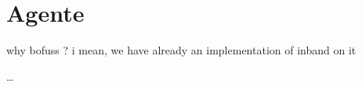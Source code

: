 \section{Agente }
\label{sec:ana_switch}

why bofuss ? i mean, we have already an implementation of inband on it

\dots